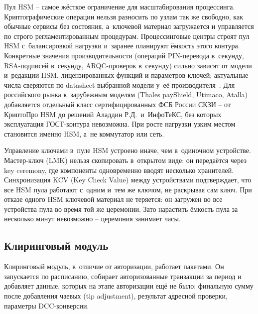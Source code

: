 Пул HSM -- самое жёсткое ограничение для масштабирования
процессинга. Криптографические операции нельзя разносить
по узлам так же свободно, как обычные сервисы без состояния,
а~ключевой материал загружается и управляется по строго
регламентированным процедурам. Процессинговые центры строят
пул HSM с~балансировкой нагрузки и~заранее планируют ёмкость
этого контура. Конкретные значения производительности (операций
PIN-перевода в~секунду, RSA-подписей в~секунду, ARQC-проверок
в~секунду) сильно зависят от модели и~редакции HSM, лицензированных
функций и параметров ключей; актуальные числа сверяются
по datasheet выбранной модели у~её
производителя~\cite{pci-pin-security,pci-pts-hsm,ansi-x9-24}.
Для российского рынка к~зарубежным моделям (Thales payShield,
Utimaco, Atalla) добавляется отдельный класс сертифицированных
ФСБ России СКЗИ -- от КриптоПро HSM до решений Аладдин Р.Д.\
и~ИнфоТеКС, без которых эксплуатация ГОСТ-контура невозможна.
При росте нагрузки узким местом становится именно HSM,
а~не коммутатор или сеть.


Управление ключами в~пуле HSM устроено иначе, чем в~одиночном
устройстве. Мастер-ключ (LMK) нельзя скопировать в~открытом виде:
он передаётся через key ceremony, где компоненты одновременно вводят
несколько хранителей. Синхронизация KCV (Key Check Value) между
устройствами подтверждает, что все HSM пула работают с~одним и~тем
же ключом, не раскрывая сам ключ. При отказе одного HSM ключевой
материал не теряется: он загружен во все устройства пула во время
той же церемонии. Зато нарастить ёмкость пула за несколько минут
невозможно -- церемония занимает часы.

\subsection*{Клиринговый модуль}

Клиринговый модуль, в~отличие от авторизации, работает
пакетами. Он запускается по расписанию, собирает
авторизованные транзакции за период и добавляет данные,
которых на этапе авторизации ещё не было: финальную сумму
после добавления чаевых (tip adjustment), результат адресной
проверки, параметры DCC-конверсии.

